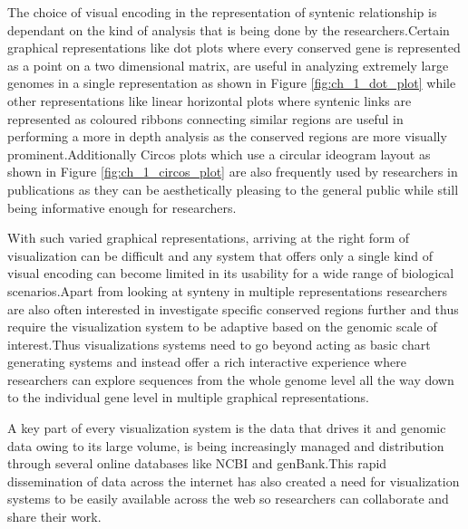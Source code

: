 The choice of visual encoding in the representation of syntenic relationship is dependant on the kind of analysis that is being done by the researchers.Certain graphical representations like dot plots where every conserved gene is represented as a point on a two dimensional matrix, are useful in analyzing extremely large genomes in a single representation as shown in Figure \ref{fig:ch_1_dot_plot} while other representations like linear horizontal plots where syntenic links are represented as coloured ribbons connecting similar regions are useful in performing a more in depth analysis as the conserved regions are more visually prominent.Additionally Circos plots which use a circular ideogram layout as shown in Figure \ref{fig:ch_1_circos_plot} are also frequently used by researchers in publications as they can be aesthetically pleasing to the general public while still being informative enough for researchers.

With such varied graphical representations, arriving at the right form of visualization can be difficult and any system that offers only a single kind of visual encoding can become limited in its usability for a wide range of biological scenarios.Apart from looking at synteny in multiple representations researchers are also often interested in  investigate specific conserved regions further and thus require the visualization system to be adaptive based on the genomic scale of interest.Thus visualizations systems need to go beyond acting as basic chart generating systems and instead offer a rich interactive experience where researchers can explore sequences from the whole genome level all the way down to the individual gene level in multiple graphical representations.

A key part of every visualization system is the data that drives it and genomic data owing to its large volume, is being increasingly managed and distribution through several online databases like NCBI and genBank.This rapid dissemination of data across the internet has also created a need for visualization systems to be easily available across the web so researchers can collaborate and share their work.


